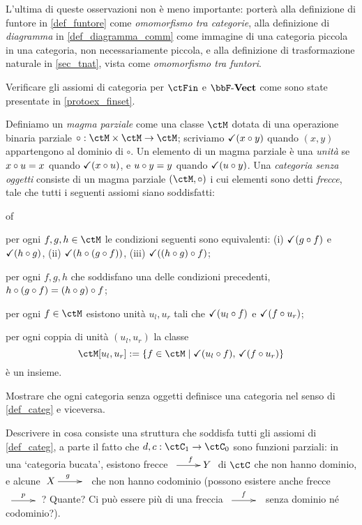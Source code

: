 L'ultima di queste osservazioni non è meno importante: porterà alla definizione di funtore in \ref{def_funtore} come \emph{omomorfismo tra categorie}, alla definizione di \emph{diagramma} in \ref{def_diagramma_comm} come immagine di una categoria piccola in una categoria, non necessariamente piccola, e alla definizione di trasformazione naturale in \ref{sec_tnat}, vista come \emph{omomorfismo tra funtori}.
\begin{esercizi}
	\item \label{jgdasoh_4} Verificare gli assiomi di categoria per \(\ctFin\) e \(\ctVect\) come sono state presentate in \ref{protoex_finset}.
	\item \label{jgdasoh_1} Definiamo un \emph{magma parziale} come una classe \(\ctM\) dotata di una operazione binaria parziale \(\circ : \ctM\times\ctM\to\ctM\); scriviamo \(\checkmark(x\circ y)\) quando \((x,y)\) appartengono al dominio di \(\circ\). Un elemento di un magma parziale è una \emph{unità} se \(x\circ u = x\) quando \(\checkmark(x\circ u)\), e \(u\circ y = y\) quando \(\checkmark(u\circ y)\). Una \emph{categoria senza oggetti} consiste di un magma parziale \((\ctM,\cmp)\) i cui elementi sono detti \emph{frecce}, tale che tutti i seguenti assiomi siano soddisfatti:
	\begin{enumtag}{of}
		\item per ogni \(f,g,h\in\ctM\) le condizioni seguenti sono equivalenti: (i) \(\checkmark(g\circ f)\) e \(\checkmark(h\circ g)\), (ii) \(\checkmark(h\circ (g\circ f))\), (iii) \(\checkmark((h\circ g)\circ f)\);
		\item per ogni \(f,g,h\) che soddisfano una delle condizioni precedenti, \(h\circ (g\circ f) = (h\circ g)\circ f\);
		\item per ogni \(f\in\ctM\) esistono unità \(u_l,u_r\) tali che \(\checkmark(u_l\circ f)\) e \(\checkmark(f\circ u_r)\);
		\item per ogni coppia di unità \((u_l,u_r)\) la classe
		\[\ctM[u_l,u_r] := \{f\in\ctM\mid \checkmark(u_l\cmp f),\,\checkmark(f\cmp u_r)\}\]
		è un insieme.
	\end{enumtag}
	Mostrare che ogni categoria senza oggetti definisce una categoria nel senso di \ref{def_categ} e viceversa.
	\item \label{jgdasoh_2} Descrivere in cosa consiste una struttura che soddisfa tutti gli assiomi di \ref{def_categ}, a parte il fatto che \(d,c : \ctC_1\to\ctC_0\) sono funzioni parziali: in una `categoria bucata', esistono frecce \(\xymatrix{{} \ar[r]^f & Y}\) di \(\ctC\) che non hanno dominio, e alcune \(\xymatrix{X \ar[r]^g & {}}\) che non hanno codominio (possono esistere anche frecce \(\xymatrix{{} \ar[r]^p & {}}\)? Quante? Ci può essere più di una freccia \(\xymatrix{{} \ar[r]^f & {}}\) senza dominio né codominio?).

\end{esercizi}
